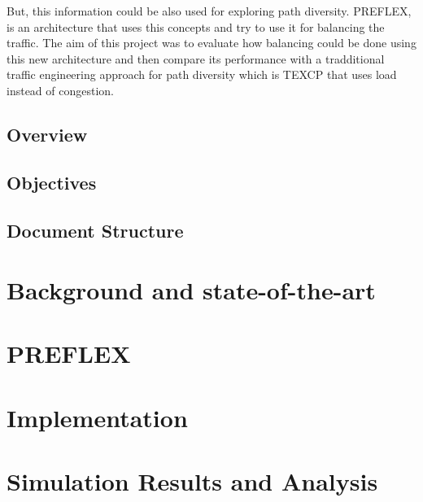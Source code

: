 \documentclass[mres, **20pt**]{ucl_thesis}
\begin{document}
But, this information could be also used for exploring path diversity. PREFLEX, is an architecture that uses this concepts and try to use it for balancing the traffic. The aim of this project was to evaluate how balancing could be done using this new architecture and then compare its performance with a tradditional traffic engineering approach for path diversity which is TEXCP that uses load instead of congestion.


\label{intro}
\section{Overview}     %
\section{Objectives}
\section{Document Structure}

\chapter{Background and state-of-the-art}



\chapter{PREFLEX }

\chapter{Implementation}

\chapter{Simulation Results and Analysis}
\end{document}
